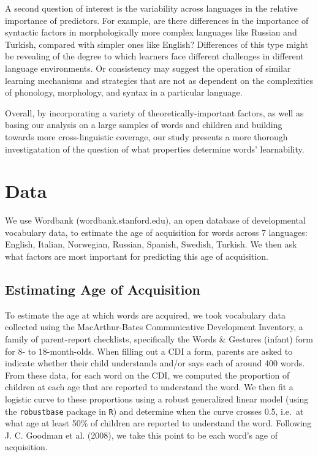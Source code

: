 \documentclass[10pt, letterpaper]{article}
\begin{document}
A second question of interest is the variability across languages in the
relative importance of predictors. For example, are there differences in
the importance of syntactic factors in morphologically more complex
languages like Russian and Turkish, compared with simpler ones like
English? Differences of this type might be revealing of the degree to
which learners face different challenges in different language
environments. Or consistency may suggest the operation of similar
learning mechanisms and strategies that are not as dependent on the
complexities of phonology, morphology, and syntax in a particular
language.

Overall, by incorporating a variety of theoretically-important factors,
as well as basing our analysis on a large samples of words and children
and building towards more cross-linguistic coverage, our study presents
a more thorough investigatation of the question of what properties
determine words' learnability.

\section{Data}\label{data}

We use Wordbank (wordbank.stanford.edu), an open database of
developmental vocabulary data, to estimate the age of acquisition for
words across 7 languages: English, Italian, Norwegian, Russian, Spanish,
Swedish, Turkish. We then ask what factors are most important for
predicting this age of acquisition.

\subsection{Estimating Age of
Acquisition}\label{estimating-age-of-acquisition}

To estimate the age at which words are acquired, we took vocabulary data
collected using the MacArthur-Bates Communicative Development Inventory,
a family of parent-report checklists, specifically the Words \& Gestures
(infant) form for 8- to 18-month-olds. When filling out a CDI a form,
parents are asked to indicate whether their child understands and/or
says each of around 400 words. From these data, for each word on the
CDI, we computed the proportion of children at each age that are
reported to understand the word. We then fit a logistic curve to these
proportions using a robust generalized linear model (using the
\texttt{robustbase} package in \texttt{R}) and determine when the curve
crosses 0.5, i.e.~at what age at least 50\% of children are reported to
understand the word. Following J. C. Goodman et al. (2008), we take this
point to be each word's age of acquisition.
\end{document}
